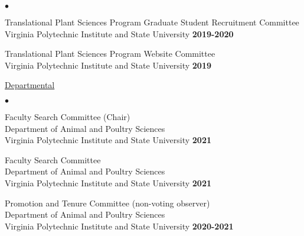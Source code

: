 \documentclass[margin,line,10pt]{res}
\newenvironment{list2}{
  \begin{list}{$\bullet$}{%
      \setlength{\itemsep}{0in}
      \setlength{\parsep}{0in} \setlength{\parskip}{0in}
      \setlength{\topsep}{0in} \setlength{\partopsep}{0in} 
      \setlength{\leftmargin}{0.2in}}}{\end{list}}
\begin{document}
\begin{resume}
\begin{list2}
  \vspace{0.3cm}


  \item Translational Plant Sciences Program Graduate Student Recruitment Committee \\
  Virginia Polytechnic Institute and State University  \hfill \textbf{2019-2020}\\

  \vspace{0.3cm}
  
\item Translational Plant Sciences Program Website Committee \\
  Virginia Polytechnic Institute and State University  \hfill \textbf{2019}\\

  
\end{list2}

  
\begin{flushleft}
  \hspace{0.3cm} \underline{Departmental}
\end{flushleft}
\begin{list2}

  \item Faculty Search Committee (Chair) \\
  Department of Animal and Poultry Sciences \\ Virginia Polytechnic Institute and State University   \hfill \textbf{2021}\\

  
  \vspace{0.3cm}

   \item  Faculty Search Committee \\
  Department of Animal and Poultry Sciences \\ Virginia Polytechnic Institute and State University   \hfill \textbf{2021}\\

      \vspace{0.3cm}
  
\item Promotion and Tenure Committee (non-voting observer) \\
  Department of Animal and Poultry Sciences \\ Virginia Polytechnic Institute and State University   \hfill \textbf{2020-2021}\\


\end{list2}
\end{resume}
\end{document}
